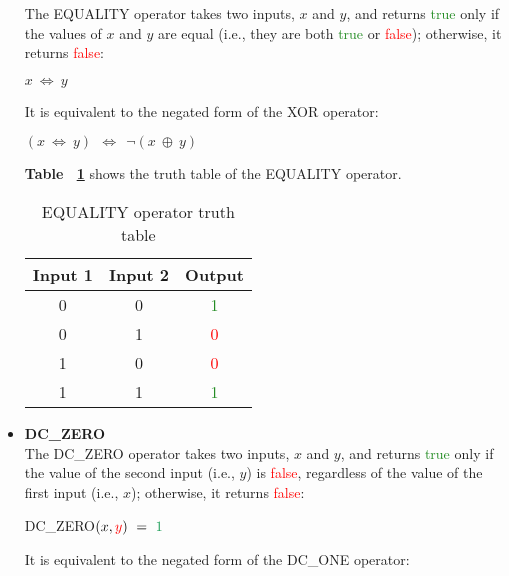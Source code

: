 \documentclass[]{usiinfbachelorproject}
\begin{document}
\begin{itemize}
        The EQUALITY operator takes two inputs, $x$ and $y$, and returns \textcolor{ForestGreen}{true} only if the values of $x$ and $y$ are equal (i.e., they are both \textcolor{ForestGreen}{true} or \textcolor{red}{false}); otherwise, it returns \textcolor{red}{false}:
        \begin{center}
            $x \ \Longleftrightarrow \ y$
        \end{center}
        It is equivalent to the negated form of the XOR operator:
        \begin{center}
            $(x \ \Longleftrightarrow \ y) \ \ \Longleftrightarrow \ \ \neg(x \ \oplus \ y)$
        \end{center}
        \textbf{Table ~\ref{tab:equality-table}} shows the truth table of the EQUALITY operator.
        \begin{table}[H]
            \centering
            \begin{tabular}{|c|c|c|}
                \hline
                \textbf{Input 1} & \textbf{Input 2} & \textbf{Output} \\
                \hline
                0 & 0 & \textcolor{ForestGreen}{1} \\ 
                \hline
                0 & 1 & \textcolor{red}{0} \\ 
                \hline
                1 & 0 & \textcolor{red}{0} \\ 
                \hline
                1 & 1 & \textcolor{ForestGreen}{1} \\ 
                \hline
            \end{tabular}
            \caption{EQUALITY operator truth table}
            \label{tab:equality-table}
        \end{table}
    \item \textbf{DC\_ZERO}
        \vspace{0.2cm} \\
        The DC\_ZERO operator takes two inputs, $x$ and $y$, and returns \textcolor{ForestGreen}{true} only if the value of the second input (i.e., $y$) is \textcolor{red}{false}, regardless of the value of the first input (i.e., $x$); otherwise, it returns \textcolor{red}{false}:
        \begin{center}
            DC\_ZERO$(x,\textcolor{red}{y}) \ = \ \textcolor{ForestGreen}{1}$
        \end{center}
        It is equivalent to the negated form of the DC\_ONE operator:
        \begin{center}

\end{center}
\end{itemize}
\end{document}
